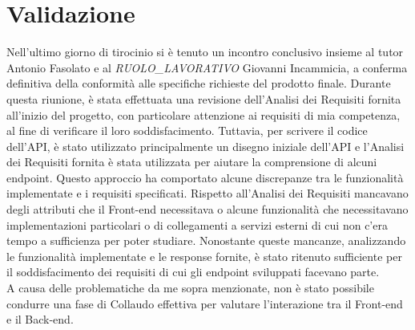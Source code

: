 \section{Validazione}
Nell’ultimo giorno di tirocinio si è tenuto un incontro conclusivo insieme al tutor Antonio Fasolato e al \textit{RUOLO\_LAVORATIVO} Giovanni Incammicia, a conferma definitiva della conformità alle specifiche richieste del prodotto finale. Durante questa riunione, è stata effettuata una revisione dell'Analisi dei Requisiti fornita all'inizio del progetto, con particolare attenzione ai requisiti di mia competenza, al fine di verificare il loro soddisfacimento. Tuttavia, per scrivere il codice dell’API, è stato utilizzato principalmente un disegno iniziale dell’API e l’Analisi dei Requisiti fornita è stata utilizzata per aiutare la comprensione di alcuni endpoint. Questo approccio ha comportato alcune discrepanze tra le funzionalità implementate e i requisiti specificati. Rispetto all’Analisi dei Requisiti mancavano degli attributi che il Front-end necessitava o alcune funzionalità che necessitavano implementazioni particolari o di collegamenti a servizi esterni di cui non c’era tempo a sufficienza per poter studiare. Nonostante queste mancanze, analizzando le funzionalità implementate e le response fornite, è stato ritenuto sufficiente per il soddisfacimento dei requisiti di cui gli endpoint sviluppati facevano parte.\\
A causa delle problematiche da me sopra menzionate, non è stato possibile condurre una fase di Collaudo effettiva per valutare l'interazione tra il Front-end e il Back-end.